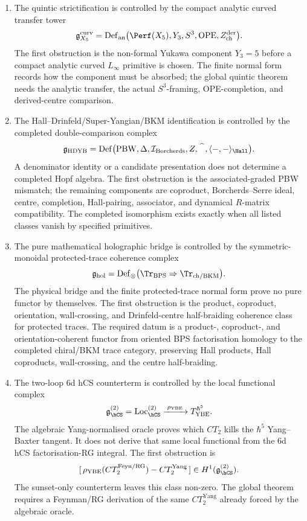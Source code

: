 \begin{proposition}
\begin{enumerate}[label=\textup{(\roman*)}]
\item The quintic strictification is controlled by the compact analytic
curved transfer tower
\[
 \mathfrak g_{X_5}^{\mathrm{curv}}
 =
 \mathrm{Def}_{\mathrm{an}}\bigl(\Perf(X_5),Y_3,S^3,
 \mathrm{OPE},Z^{\mathrm{der}}_{\mathrm{ch}}\bigr).
\]
The first obstruction is the non-formal Yukawa component
$Y_3=5$ before a compact analytic curved $L_\infty$ primitive is chosen.
The finite normal form records how the component must be absorbed; the
global quintic theorem needs the analytic transfer, the actual
$S^3$-framing, OPE-completion, and derived-centre comparison.

\item The Hall--Drinfeld/Super-Yangian/BKM identification is controlled
by the completed double-comparison complex
\[
 \mathfrak g_{\mathrm{HDYB}}
 =
 \mathrm{Def}\bigl(\mathrm{PBW},\Delta,\mathcal I_{\mathrm{Borcherds}},
 Z,\widehat{\phantom A},\langle-,-\rangle_{\Hall}\bigr).
\]
A denominator identity or a candidate presentation does not determine a
completed Hopf algebra. The first obstruction is the associated-graded
PBW mismatch; the remaining components are coproduct, Borcherds--Serre
ideal, centre, completion, Hall-pairing, associator, and dynamical
$R$-matrix compatibility. The completed isomorphism exists exactly
when all listed classes vanish by specified primitives.

\item The pure mathematical holographic bridge is controlled by the
symmetric-monoidal protected-trace coherence complex
\[
 \mathfrak g_{\mathrm{hol}}
 =
 \mathrm{Def}_{\otimes}\bigl(\Tr_{\mathrm{BPS}}\Rightarrow
 \Tr_{\mathrm{ch}/\mathrm{BKM}}\bigr).
\]
The physical bridge and the finite protected-trace normal form prove no
pure functor by themselves. The first obstruction is the product,
coproduct, orientation, wall-crossing, and Drinfeld-centre
half-braiding coherence class for protected traces. The required datum
is a product-, coproduct-, and orientation-coherent functor from
oriented BPS factorisation homology to the completed chiral/BKM trace
category, preserving Hall products, Hall coproducts, wall-crossing, and
the centre half-braiding.

\item The two-loop 6d hCS counterterm is controlled by the local
functional complex
\[
 \mathfrak g_{\hCS}^{(2)}
 =
 \mathrm{Loc}_{\hCS}^{(2)} \xrightarrow{\;\rho_{\mathrm{YBE}}\;}
 T_{\mathrm{YBE}}^{\hbar^5}.
\]
The algebraic Yang-normalised oracle proves which $CT_2$ kills the
$\hbar^5$ Yang--Baxter tangent. It does not derive that same local
functional from the 6d hCS factorisation-RG integral. The first
obstruction is
\[
 [\,\rho_{\mathrm{YBE}}(CT_2^{\mathrm{Feyn/RG}})
 - CT_2^{\mathrm{Yang}}\,]\in H^1(\mathfrak g_{\hCS}^{(2)}).
\]
The sunset-only counterterm leaves this class non-zero. The global theorem
requires a Feynman/RG derivation of the same $CT_2^{\mathrm{Yang}}$
already forced by the algebraic oracle.
\end{enumerate}
\end{proposition}

